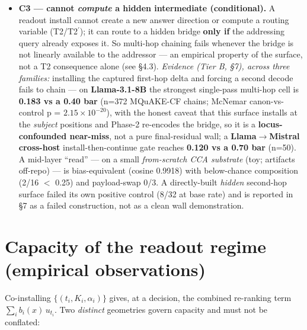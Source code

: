 \documentclass[11pt]{article}
\theoremstyle{plain}
\theoremstyle{definition}
\begin{document}
\begin{itemize}
\item \textbf{C3 --- cannot \emph{compute} a hidden intermediate (conditional).} A readout install cannot create a new answer direction or compute a routing variable (T2/T2$^{\prime}$); it can route to a hidden bridge \textbf{only if} the addressing query already exposes it. So multi-hop chaining fails whenever the bridge is not linearly available to the addressor --- an empirical property of the surface, not a T2 consequence alone (see \S4.3). \emph{Evidence (Tier B, \S7), across three families:} installing the captured first-hop delta and forcing a second decode fails to chain --- on \textbf{Llama-3.1-8B} the strongest single-pass multi-hop cell is \textbf{0.183 vs a 0.40 bar} (n=372 MQuAKE-CF chains; McNemar canon-vs-control p = $2.15\times10^{-20}$), with the honest caveat that this surface installs at the \emph{subject} positions and Phase-2 re-encodes the bridge, so it is a \textbf{locus-confounded near-miss}, not a pure final-residual wall; a \textbf{Llama$\to$Mistral cross-host} install-then-continue gate reaches \textbf{0.120 vs a 0.70 bar} (n=50). A mid-layer ``read'' --- on a small \emph{from-scratch CCA substrate} (toy; artifacts off-repo) --- is bias-equivalent (cosine 0.9918) with below-chance composition (2/16 $<$ 0.25) and payload-swap 0/3. A directly-built \emph{hidden} second-hop surface failed its own positive control (8/32 at base rate) and is reported in \S7 as a failed construction, not as a clean wall demonstration.
\end{itemize}

\section{Capacity of the readout regime (empirical observations)}

Co-installing $\{(t_i,K_i,\alpha_i)\}$ gives, at a decision, the combined re-ranking term $\sum_i b_i(x)\, u_{t_i}$. Two \emph{distinct} geometries govern capacity and must not be conflated:
\end{document}
